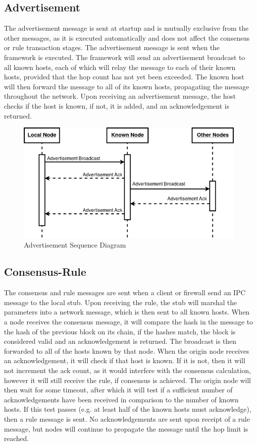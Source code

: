 \documentclass[a4paper, 11pt]{report}
\begin{document}
\subsection{Advertisement}
The advertisement message is sent at startup and is mutually exclusive from the other messages, as it is executed automatically and does not affect the consensus or rule transaction stages. The advertisement message is sent when the framework is executed. The framework will send an advertisement broadcast to all known hosts, each of which will relay the message to each of their known hosts, provided that the hop count has not yet been exceeded. The known host will then forward the message to all of its known hosts, propagating the message throughout the network. Upon receiving an advertisement message, the host checks if the host is known, if not, it is added, and an acknowledgement is returned.

\begin{figure}[H]
\centering
\includegraphics[width=\textwidth,keepaspectratio]{advertisement_seq}
\caption{Advertisement Sequence Diagram} 
\label{fig:advseq}
\end{figure}

\subsection{Consensus-Rule}
The consensus and rule messages are sent when a client or firewall send an \acrshort{IPC} message to the local \gls{stub}. Upon receiving the rule, the \gls{stub} will marshal the parameters into a network message, which is then sent to all known hosts. When a node receives the consensus message, it will compare the hash in the message to the hash of the previous block on its chain, if the hashes match, the block is considered valid and an acknowledgement is returned. The broadcast is then forwarded to all of the hosts known by that node. When the origin node receives an acknowledgement, it will check if that host is known. If it is not, then it will not increment the ack count, as it would interfere with the consensus calculation, however it will still receive the rule, if consensus is achieved. The origin node will then wait for some timeout, after which it will test if a sufficient number of acknowledgements have been received in comparison to the number of known hosts. If this test passes (e.g. at least half of the known hosts must acknowledge), then a rule message is sent. No acknowledgements are sent upon receipt of a rule message, but nodes will continue to propagate the message until the hop limit is reached.
\end{document}
